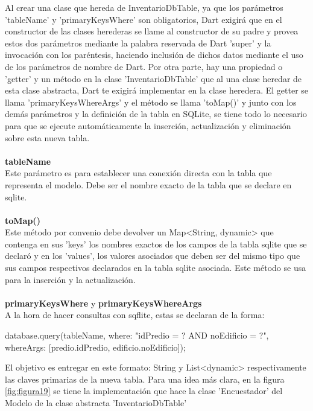 Al crear una clase que hereda de InventarioDbTable, ya que los parámetros 'tableName' y 'primaryKeysWhere' son obligatorios, Dart exigirá que en el constructor de las clases herederas se llame al constructor de su padre
y provea estos dos parámetros mediante la palabra reservada de Dart 'super' y la invocación con los paréntesis, haciendo inclusión de dichos datos mediante el uso de los parámetros de nombre de Dart. Por otra parte, hay una propiedad o 'getter' y un método en la clase 'InventarioDbTable' que al
una clase heredar de esta clase abstracta, Dart te exigirá implementar en la clase heredera. El getter se llama 'primaryKeysWhereArgs' y el método se llama 'toMap()' y junto con los demás parámetros y la definición de la tabla en SQLite, se tiene todo lo necesario para que se ejecute automáticamente la inserción, actualización y eliminación sobre esta nueva tabla.
\\\\
\textbf{tableName}\\
Este parámetro es para establecer una conexión directa con la tabla que representa el modelo. Debe ser el nombre exacto de la tabla que se declare en sqlite.
\\\\
\textbf{toMap()}\\
Este método por convenio debe devolver un Map<String, dynamic> que contenga en sus 'keys' los nombres exactos de los campos de la tabla sqlite que se declaró y en los 'values', los valores asociados que deben ser del mismo tipo que sus campos respectivos declarados en la tabla sqlite asociada.
Este método se usa para la inserción y la actualización.
\\\\
\textbf{primaryKeysWhere} y \textbf{primaryKeysWhereArgs}\\
A la hora de hacer consultas con sqflite, estas se declaran de la forma:
\begin{mdframed}
    database.query(tableName, where: "$ $idPredio = ? AND noEdificio = ?", whereArgs: [predio.idPredio, edificio.noEdificio]);
\end{mdframed}
El objetivo es entregar en este formato: String y List<dynamic> respectivamente las claves primarias de la nueva tabla. Para una idea más clara, en la figura \ref{fig:figura19} se tiene la implementación que
hace la clase 'Encuestador' del Modelo de la clase abstracta 'InventarioDbTable'
\\\\
